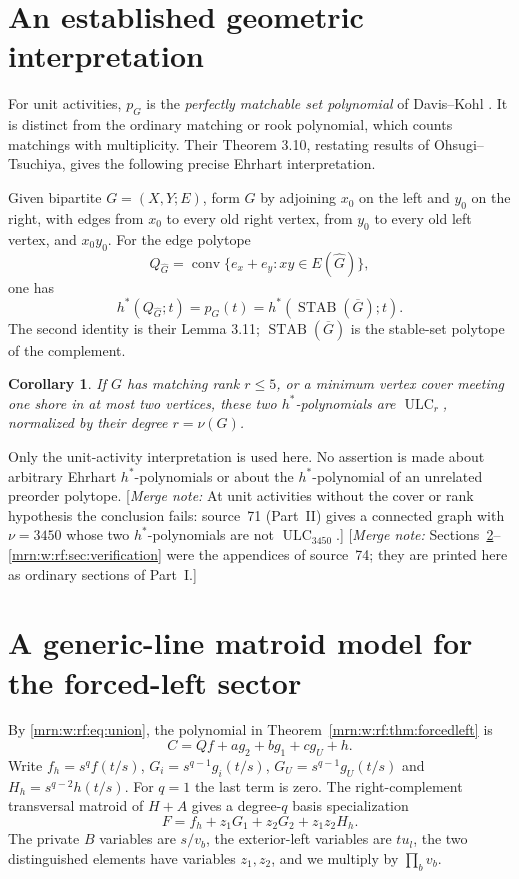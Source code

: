 \documentclass[11pt,a4paper]{article}
\newtheorem{corollary}[theorem]{Corollary}
\theoremstyle{remark}\newtheorem{remark}[theorem]{Remark}
\newcommand{\ULC}{\operatorname{ULC}}      %
\newcommand{\mnote}[1]{[\textit{Merge note:} #1]}
\begin{document}
\section{An established geometric interpretation}\label{mrn:w:rf:sec:geometry}
For unit activities, $p_G$ is the \emph{perfectly matchable set polynomial} of Davis--Kohl \cite{b:DK}. It is distinct from the ordinary matching or rook polynomial, which counts matchings with multiplicity. Their Theorem 3.10, restating results of Ohsugi--Tsuchiya, gives the following precise Ehrhart interpretation.

Given bipartite $G=(X,Y;E)$, form $\widehat G$ by adjoining $x_0$ on the left and $y_0$ on the right, with edges from $x_0$ to every old right vertex, from $y_0$ to every old left vertex, and $x_0y_0$. For the edge polytope
\[
 Q_{\widehat G}=\operatorname{conv}\{e_x+e_y:xy\in E(\widehat G)\},
\]
one has
\[
 h^*(Q_{\widehat G};t)=p_G(t)=h^*(\operatorname{STAB}(\overline G);t).
\]
The second identity is their Lemma 3.11; $\operatorname{STAB}(\overline G)$ is the stable-set polytope of the complement.

\begin{corollary}
If $G$ has matching rank $r\le5$, or a minimum vertex cover meeting one shore in at most two vertices, these two $h^*$-polynomials are $\ULC_r$, normalized by their degree $r=\nu(G)$.
\end{corollary}
Only the unit-activity interpretation is used here. No assertion is made about arbitrary Ehrhart $h^*$-polynomials or about the $h^*$-polynomial of an unrelated preorder polytope.
\mnote{At unit activities without the cover or rank hypothesis the conclusion fails: source~71 (Part~II) gives a connected graph with $\nu=3450$ whose two $h^*$-polynomials are not $\ULC_{3450}$.}
 \mnote{Sections~\ref{mrn:w:rf:sec:line}--\ref{mrn:w:rf:sec:verification} were the appendices of source~74; they are printed here as ordinary sections of Part~I.}

\section{A generic-line matroid model for the forced-left sector}\label{mrn:w:rf:sec:line}
By \eqref{mrn:w:rf:eq:union}, the polynomial in Theorem~\ref{mrn:w:rf:thm:forcedleft} is
\begin{equation}\label{mrn:w:rf:eq:C}
 C=Qf+a g_2+b g_1+c g_U+h.
\end{equation}
Write $f_h=s^qf(t/s)$, $G_i=s^{q-1}g_i(t/s)$, $G_U=s^{q-1}g_U(t/s)$ and $H_h=s^{q-2}h(t/s)$. For $q=1$ the last term is zero. The right-complement transversal matroid of $H+A$ gives a degree-$q$ basis specialization
\[
 F=f_h+z_1G_1+z_2G_2+z_1z_2H_h.
\]
The private $B$ variables are $s/v_b$, the exterior-left variables are $tu_l$, the two distinguished elements have variables $z_1,z_2$, and we multiply by $\prod_bv_b$.
\end{document}

